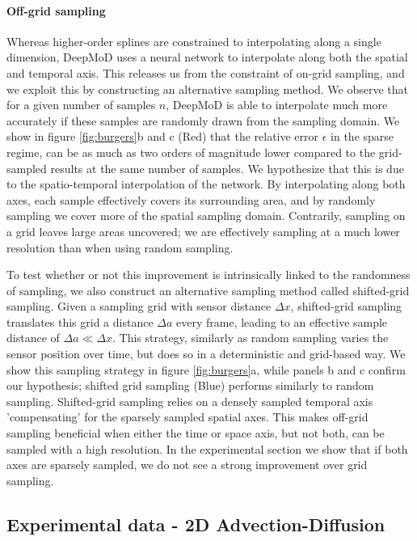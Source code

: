 \documentclass{article} %
\begin{document}
\paragraph{Off-grid sampling} Whereas higher-order splines are constrained to interpolating along a single dimension, DeepMoD uses a neural network to interpolate along both the spatial and temporal axis. This releases us from the constraint of on-grid sampling, and we exploit this by constructing an alternative sampling method. We observe that for a given number of samples $n$, DeepMoD is able to interpolate much more accurately if these samples are randomly drawn from the sampling domain. We show in figure \ref{fig:burgers}b and c (Red) that the relative error $\epsilon$ in the sparse regime, can be as much as two orders of magnitude lower compared to the grid-sampled results at the same number of samples. We hypothesize that this is due to the spatio-temporal interpolation of the network. By interpolating along both axes, each sample effectively covers its surrounding area, and by randomly sampling we cover more of the spatial sampling domain. Contrarily, sampling on a grid leaves large areas uncovered; we are effectively sampling at a much lower resolution than when using random sampling.

To test whether or not this improvement is intrinsically linked to the randomness of sampling, we also construct an alternative sampling method called shifted-grid sampling. Given a sampling grid with sensor distance $\Delta x$, shifted-grid sampling translates this grid a distance $\Delta a$ every frame, leading to an effective sample distance of $\Delta a \ll \Delta x$. This strategy, similarly as random sampling varies the sensor position over time, but does so in a deterministic and grid-based way. We show this sampling strategy in figure \ref{fig:burgers}a, while panels b and c confirm our hypothesis; shifted grid sampling (Blue) performs similarly to random sampling. Shifted-grid sampling relies on a densely sampled temporal axis 'compensating' for the sparsely sampled spatial axes. This makes off-grid sampling beneficial when either the time or space axis, but not both, can be sampled with a high resolution. In the experimental section we show that if both axes are sparsely sampled, we do not see a strong improvement over grid sampling. 

\subsection{Experimental data - 2D Advection-Diffusion}
\end{document}
